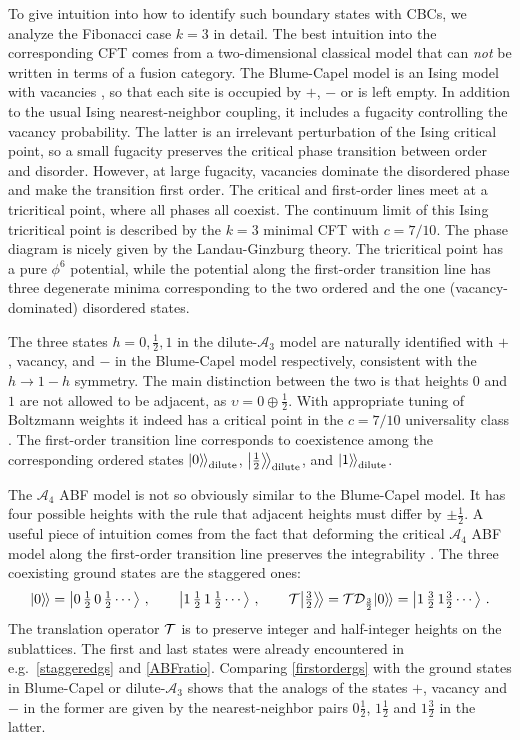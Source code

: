To give intuition into how to identify such boundary states with CBCs, we analyze the Fibonacci case $k=3$ in detail. The best intuition into the corresponding CFT comes from a two-dimensional classical model that can {\em not} be written in terms of a fusion category. The Blume-Capel model is an Ising model with vacancies \cite{Blume1971}, so that each site is occupied by $+$, $-$ or is left empty. In addition to the usual Ising nearest-neighbor coupling, it includes a fugacity controlling the vacancy probability. The latter is an irrelevant perturbation of the Ising critical point, so a small fugacity preserves the critical phase transition between order and disorder. However, at large fugacity, vacancies dominate the disordered phase and make the transition first order. The critical and first-order lines meet at a tricritical point,  where all phases all coexist. The continuum limit of this Ising tricritical point is described by the $k=3$ minimal CFT with $c=7/10$. The phase diagram is nicely given by the Landau-Ginzburg theory. The tricritical point has a pure $\phi^6$ potential, while the potential along the first-order transition line has three degenerate minima corresponding to the two ordered and the one (vacancy-dominated) disordered states.

The three states $h=0,\frac12,1$ in the dilute-$\mathcal{A}_3$ model are naturally identified with  $+$, vacancy, and $-$ in the Blume-Capel model respectively, consistent with the $h\to 1-h$ symmetry. The main distinction between the two is that heights $0$ and $1$ are not allowed to be adjacent, as $\upsilon=0\oplus \tfrac12$. With appropriate tuning of Boltzmann weights it indeed has a critical point in the $c=7/10$ universality class \cite{Warnaar1992}.  The first-order transition line corresponds to coexistence among the corresponding ordered states ${|{0}\rangle\mkern-2mu\rangle}_{\rm dilute}$, ${\big|{\tfrac12}\big\rangle\!\big\rangle}_{\rm dilute}$, and
${|{1}\rangle\mkern-2mu\rangle}_{\rm dilute}$.

The $\mathcal{A}_4$ ABF model is not so obviously similar to the Blume-Capel model. It has four possible heights with the rule that adjacent heights must differ by $\pm\tfrac12$. A useful piece of intuition comes from the fact that deforming the critical $\mathcal{A}_4$ ABF model along the first-order transition line preserves the integrability \cite{Andrews1984,Fendley2004}. The three coexisting ground states are the staggered ones: \cite{Huse1984}
\begin{align}
	{|{0}\rangle\mkern-2mu\rangle} = \Ket{0\,\tfrac{1}{2}\,0\,\tfrac{1}{2}\cdots} \,,\qquad \Ket{1\,\tfrac{1}{2}\,1\,\tfrac{1}{2}\cdots} \,,\qquad
	\mathcal{T}{\big|{\tfrac{3}{2}}\big\rangle\!\big\rangle} = \mathcal{T}\mathcal{D}_{\frac{3}{2}}{|{0}\rangle\mkern-2mu\rangle}=
	\Ket{1\,\tfrac{3}{2}\,1\tfrac{3}{2}\cdots} \,.
\label{firstordergs}
\end{align}
The translation operator $\mathcal{T}$ is to preserve integer and half-integer heights on the sublattices. The first and last states were already encountered in e.g.\ \eqref{staggeredgs} and \eqref{ABFratio}.  Comparing \eqref{firstordergs} with the ground states in Blume-Capel or dilute-$\mathcal{A}_3$ shows that the analogs of the states $+$, vacancy and $-$ in the former are given by the nearest-neighbor pairs $0\tfrac12$, $1\tfrac12$ and $1\tfrac32$ in the latter.

